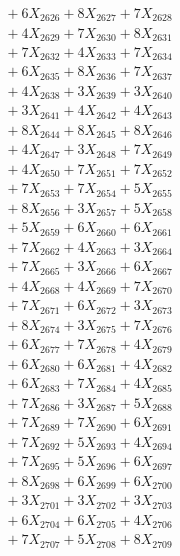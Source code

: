 \documentclass[a4paper,10pt]{article}
\begin{document}
{\begin{align}
&\;  + 6 X_{2626} + 8 X_{2627} + 7 X_{2628} \\[0.3ex]
&\;  + 4 X_{2629} + 7 X_{2630} + 8 X_{2631} \\[0.3ex]
&\;  + 7 X_{2632} + 4 X_{2633} + 7 X_{2634} \\[0.3ex]
&\;  + 6 X_{2635} + 8 X_{2636} + 7 X_{2637} \\[0.3ex]
&\;  + 4 X_{2638} + 3 X_{2639} + 3 X_{2640} \\[0.3ex]
&\;  + 3 X_{2641} + 4 X_{2642} + 4 X_{2643} \\[0.3ex]
&\;  + 8 X_{2644} + 8 X_{2645} + 8 X_{2646} \\[0.3ex]
&\;  + 4 X_{2647} + 3 X_{2648} + 7 X_{2649} \\[0.5ex]\allowbreak
&\;  + 4 X_{2650} + 7 X_{2651} + 7 X_{2652} \\[0.3ex]
&\;  + 7 X_{2653} + 7 X_{2654} + 5 X_{2655} \\[0.3ex]
&\;  + 8 X_{2656} + 3 X_{2657} + 5 X_{2658} \\[0.3ex]
&\;  + 5 X_{2659} + 6 X_{2660} + 6 X_{2661} \\[0.3ex]
&\;  + 7 X_{2662} + 4 X_{2663} + 3 X_{2664} \\[0.3ex]
&\;  + 7 X_{2665} + 3 X_{2666} + 6 X_{2667} \\[0.3ex]
&\;  + 4 X_{2668} + 4 X_{2669} + 7 X_{2670} \\[0.3ex]
&\;  + 7 X_{2671} + 6 X_{2672} + 3 X_{2673} \\[0.3ex]
&\;  + 8 X_{2674} + 3 X_{2675} + 7 X_{2676} \\[0.3ex]
&\;  + 6 X_{2677} + 7 X_{2678} + 4 X_{2679} \\[0.5ex]\allowbreak
&\;  + 6 X_{2680} + 6 X_{2681} + 4 X_{2682} \\[0.3ex]
&\;  + 6 X_{2683} + 7 X_{2684} + 4 X_{2685} \\[0.3ex]
&\;  + 7 X_{2686} + 3 X_{2687} + 5 X_{2688} \\[0.3ex]
&\;  + 7 X_{2689} + 7 X_{2690} + 6 X_{2691} \\[0.3ex]
&\;  + 7 X_{2692} + 5 X_{2693} + 4 X_{2694} \\[0.3ex]
&\;  + 7 X_{2695} + 5 X_{2696} + 6 X_{2697} \\[0.3ex]
&\;  + 8 X_{2698} + 6 X_{2699} + 6 X_{2700} \\[0.3ex]
&\;  + 3 X_{2701} + 3 X_{2702} + 3 X_{2703} \\[0.3ex]
&\;  + 6 X_{2704} + 6 X_{2705} + 4 X_{2706} \\[0.3ex]
&\;  + 7 X_{2707} + 5 X_{2708} + 8 X_{2709} \\[0.5ex]\allowbreak

\end{align}}
\end{document}
